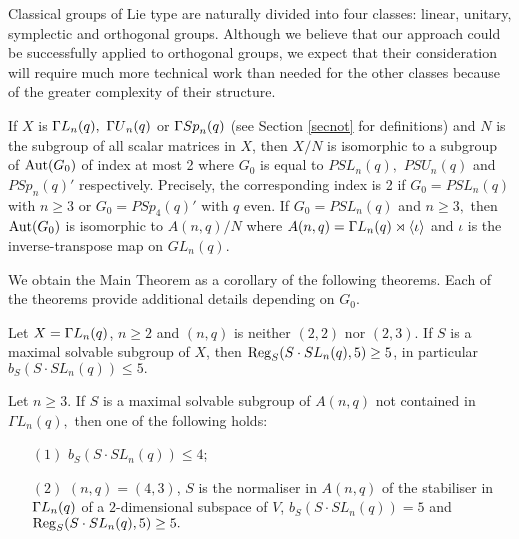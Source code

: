 

\begin{Rem}
Classical groups of Lie type are naturally divided into four classes: linear, unitary, symplectic and orthogonal groups. Although we believe that our approach could be successfully applied to orthogonal groups, we expect that their consideration will require much more technical work than needed for the other classes because 
of the greater complexity of their structure.     
\end{Rem}

If $X$ is ${{\Gamma L}}_n(q),$ ${{\Gamma U}}_n(q)$ or ${{\Gamma Sp}}_n(q)$ (see Section \ref{secnot} for definitions) and $N$ is the subgroup of all scalar matrices in $X$, then
$X/N$ is isomorphic to a subgroup of $\mathrm{Aut}(G_0)$ of index at most 2 where $G_0$ is equal to $PSL_n(q),$ $PSU_n(q)$ and $PSp_n(q)'$ respectively. Precisely, the corresponding index is 2  if $G_0=PSL_n(q)$ with $n \ge 3$ or $G_0=PSp_4(q)'$  with $q$ even.  If $G_0=PSL_n(q)$ and $n\ge 3,$ then $\mathrm{Aut}(G_0)$ is isomorphic to $A(n,q)/N$ where $A(n,q)={{\Gamma L}}_n(q) \rtimes \langle \iota \rangle$ and $\iota$ is the inverse-transpose map on $GL_n(q).$





We obtain the Main Theorem as a corollary of the following   theorems. Each of the theorems provide additional details depending on $G_0$.
\begin{mainthA}
\label{theorem}
Let $X={{\Gamma L}}_n(q)$, $n \ge 2$ and $(n,q)$ is neither $(2,2)$ nor $(2,3).$ If $S$ is a maximal solvable subgroup of $X$, 
 then $\mathrm{Reg}_S(S \cdot SL_n(q),5)\ge 5$, in particular $b_S(S \cdot SL_n(q)) \le 5.$
\end{mainthA}

\begin{mainthA}
\label{theoremGR}
Let $n\ge 3.$ If $S$ is a maximal solvable subgroup of $A(n,q)$ not contained in $\Gamma L_n(q),$ then one of the following holds:
\begin{enumerate}
\item[$(1)$] $b_S(S \cdot SL_n(q))\le 4$;
\item[$(2)$] $(n,q)=(4,3)$, $S$ is the normaliser in $A(n,q)$ of the stabiliser in ${{\Gamma L}}_n(q)$ of a $2$-dimensional subspace of $V$, $b_S(S \cdot SL_n(q))=5$ and $\mathrm{Reg}_S(S \cdot SL_n(q),5)\ge 5.$
\end{enumerate}
\end{mainthA}


